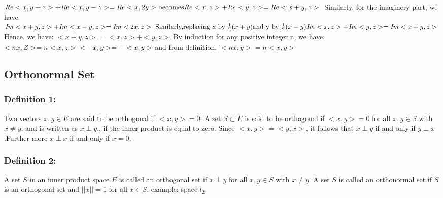 \documentclass[12pt]{article}
\begin{document}
\begin{enumerate}
\begin{math}
        \mathit{Re}<x,y+z> + \mathit{Re}<x,y-z> = \mathit{Re}<x,2y> \\
        \text{becomes} \\
        \mathit{Re}<x,z> + \mathit{Re}<y,z> = \mathit{Re}<x+y,z> \\
    \end{math}
    Similarly, for the imaginery part, we have:
    \begin{math}
        \mathit{Im}<x+y,z> + \mathit{Im}<x-y,z> = \mathit{Im}<2x,z> \\
        \text{ Similarly,replacing x by }  \frac{1}{2}(x+y)  \text{and y by } \frac{1}{2}(x-y) \\
        \mathit{Im}<x,z> + \mathit{Im}<y,z> = \mathit{Im}<x+y,z> \\
    \end{math}
    Hence, we have:
    \begin{math}
        <x+y,z> = <x,z> + <y,z>
    \end{math}
    By induction for any positive integer n, we have:
    \begin{math}
        <nx,Z> = n<x,z> \\
        <-x,y> = -<x,y>
    \end{math}
    and from definition, $<nx,y> = n<x,y>$
\end{enumerate}

\subsection*{Orthonormal Set}
\subsubsection*{Definition 1:}
Two vectors $x,y \in E$ are said to be orthogonal if $<x,y> = 0$. A set $S \subset E$ is said to be orthogonal if $<x,y> = 0$ for all $x,y \in S$ with $x \ne y$, and is written as $x \perp y$., if the inner product is equal to zero. Since $<x,y> = \bar{<y,x>}$, it follows that $x \perp y$ if and only if $y \perp x$.Further more $x \perp x$ if and only if $x = 0$.

\subsubsection*{Definition 2:}
A set $S$ in an inner product space $E$ is called an orthogonal set if $x \perp y$ for all $x,y \in S$ with $x \ne y$. A set $S$ is called an orthonormal set if $S$ is an orthogonal set and $||x|| = 1$ for all $x \in S$.
example: space $\mathit{l}_2$
\end{document}
